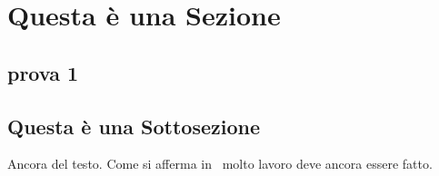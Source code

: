 \section{Questa \`e una Sezione}

\subsection {prova 1}

\subsection{Questa \`e una Sottosezione}

Ancora del testo. Come si afferma in~\cite{jones96analysis} molto lavoro deve ancora essere fatto.
